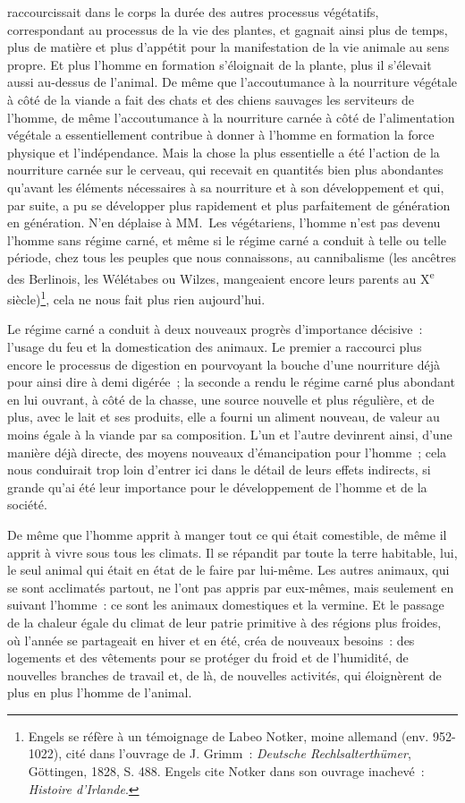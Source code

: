 \documentclass[french,twoside]{book} %
\begin{document}
raccourcissait dans le corps la durée des autres processus végétatifs, correspondant au processus de la vie des plantes, et gagnait ainsi plus de temps, plus de matière et plus d’appétit pour la manifestation de la vie animale au sens propre. Et plus l’homme en formation s’éloignait de la plante, plus il s’élevait aussi au-dessus de l’animal. De même que l’accoutumance à la nourriture végétale à côté de la viande a fait des chats et des chiens sauvages les serviteurs de l’homme, de même l’accoutumance à la nourriture carnée à côté de l’alimentation végétale a essentiellement contribue à donner à l’homme en formation la force physique et l’indépendance. Mais la chose la plus essentielle a été l’action de la nourriture carnée sur le cerveau, qui recevait en quantités bien plus abondantes qu’avant les éléments nécessaires à sa nourriture et à son développement et qui, par suite, a pu se développer plus rapidement et plus parfaitement de génération en génération. N’en déplaise à MM. Les végétariens, l’homme n’est pas devenu l’homme sans régime carné, et même si le régime carné a conduit à telle ou telle période, chez tous les peuples que nous connaissons, au cannibalisme (les ancêtres des Berlinois, les Wélétabes ou Wilzes, mangeaient encore leurs parents au X\textsuperscript{e} siècle)\footnote{Engels se réfère à un témoignage de Labeo Notker, moine allemand (env. 952-1022), cité dans l’ouvrage de J. Grimm : \emph{Deutsche Rechlsalterthümer}, Göttingen, 1828, S. 488. Engels cite Notker dans son ouvrage inachevé : \emph{Histoire d’Irlande}.}, cela ne nous fait plus rien aujourd’hui.\par
Le régime carné a conduit à deux nouveaux progrès d’importance décisive : l’usage du feu et la domestication des animaux. Le premier a raccourci plus encore le processus de digestion en pourvoyant la bouche d’une nourriture déjà pour ainsi dire à demi digérée ; la seconde a rendu le régime carné plus abondant en lui ouvrant, à côté de la chasse, une source nouvelle et plus régulière, et de plus, avec le lait et ses produits, elle a fourni un aliment nouveau, de valeur au moins égale à la viande par sa composition. L’un et l’autre devinrent ainsi, d’une manière déjà directe, des moyens nouveaux d’émancipation pour l’homme ; cela nous conduirait trop loin d’entrer ici dans le détail de leurs effets indirects, si grande qu’ai été leur importance pour le développement de l’homme et de la société.\par
De même que l’homme apprit à manger tout ce qui était comestible, de même il apprit à vivre sous tous les climats. Il se répandit par toute la terre habitable, lui, le seul animal qui était en état de le faire par lui-même. Les autres animaux, qui se sont acclimatés partout, ne l’ont pas appris par eux-mêmes, mais seulement en suivant l’homme : ce sont les animaux domestiques et la vermine. Et le passage de la chaleur égale du climat de leur patrie primitive à des régions plus froides, où l’année se partageait en hiver et en été, créa de nouveaux besoins : des logements et des vêtements pour se protéger du froid et de l’humidité, de nouvelles branches de travail et, de là, de nouvelles activités, qui éloignèrent de plus en plus l’homme de l’animal.\par
\end{document}
